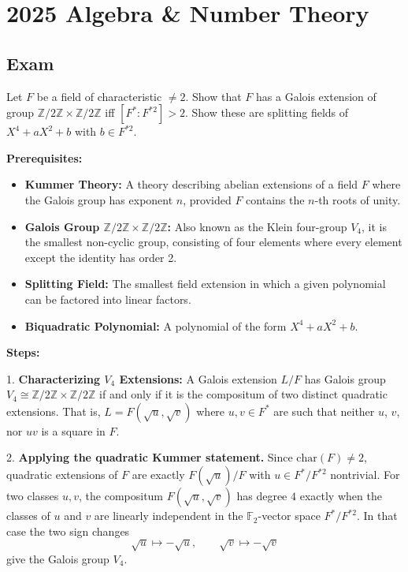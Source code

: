 \section{2025 Algebra \& Number Theory}

\subsection*{Exam}
\begin{exercise}
\label{algebra:2025:1}
Let $F$ be a field of characteristic $\neq 2$. Show that $F$ has a Galois extension of group $\mathbb{Z}/2\mathbb{Z} \times \mathbb{Z}/2\mathbb{Z}$ iff $[F^*: F^{*2}] > 2$. Show these are splitting fields of $X^4 + aX^2 + b$ with $b \in F^{*2}$.
\end{exercise}

\begin{solution}
\textbf{Prerequisites:}
\begin{itemize}
    \item \textbf{Kummer Theory:} A theory describing abelian extensions of a field $F$ where the Galois group has exponent $n$, provided $F$ contains the $n$-th roots of unity.
    \item \textbf{Galois Group $\mathbb{Z}/2\mathbb{Z} \times \mathbb{Z}/2\mathbb{Z}$:} Also known as the Klein four-group $V_4$, it is the smallest non-cyclic group, consisting of four elements where every element except the identity has order 2.
    \item \textbf{Splitting Field:} The smallest field extension in which a given polynomial can be factored into linear factors.
    \item \textbf{Biquadratic Polynomial:} A polynomial of the form $X^4 + aX^2 + b$.
\end{itemize}

\textbf{Steps:}

1. \textbf{Characterizing $V_4$ Extensions:} A Galois extension $L/F$ has Galois group $V_4 \cong \mathbb{Z}/2\mathbb{Z} \times \mathbb{Z}/2\mathbb{Z}$ if and only if it is the compositum of two distinct quadratic extensions. That is, $L = F(\sqrt{u}, \sqrt{v})$ where $u, v \in F^*$ are such that neither $u$, $v$, nor $uv$ is a square in $F$.

2. \textbf{Applying the quadratic Kummer statement.} Since $\mathrm{char}(F)\neq 2$, quadratic extensions of $F$ are exactly $F(\sqrt{u})/F$ with $u\in F^*/F^{*2}$ nontrivial. For two classes $u,v$, the compositum $F(\sqrt{u},\sqrt{v})$ has degree $4$ exactly when the classes of $u$ and $v$ are linearly independent in the $\mathbb{F}_2$-vector space $F^*/F^{*2}$. In that case the two sign changes
\[
\sqrt{u}\mapsto -\sqrt{u},
\qquad
\sqrt{v}\mapsto -\sqrt{v}
\]
give the Galois group $V_4$.


\end{solution}
